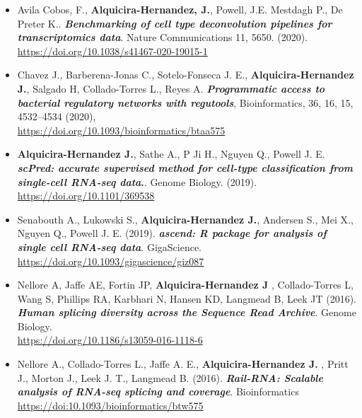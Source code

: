 \begin{itemize}
\item{Avila Cobos, F., \textbf{Alquicira-Hernandez, J.}, Powell, J.E. Mestdagh P., De Preter K.. \textit{\textbf{Benchmarking of cell type deconvolution pipelines for transcriptomics data}}.
Nature Communications 11, 5650. (2020). \\
\url{https://doi.org/10.1038/s41467-020-19015-1}}

\item{Chavez J., Barberena-Jonas C., Sotelo-Fonseca J. E., \textbf{Alquicira-Hernandez J.}, Salgado H, Collado-Torres L., Reyes A. \textbf{\textit{Programmatic access to bacterial regulatory networks with regutools}}, Bioinformatics, 36, 16, 15, 4532–4534 (2020), \\
\url{https://doi.org/10.1093/bioinformatics/btaa575}}

\item{\textbf{Alquicira-Hernandez J.}, Sathe A., P Ji H., Nguyen Q., Powell J. E. \textbf{\textit{scPred: accurate supervised method for cell-type classification from single-cell RNA-seq data}.}.
Genome Biology. (2019).\\
\url{https://doi.org/10.1101/369538}}

\item{Senabouth A., Lukowski S., \textbf{Alquicira-Hernandez J.}, Andersen S., Mei X., Nguyen Q., Powell J. E. (2019). \textbf{\textit{ascend: R package for analysis of single cell RNA-seq data}}.
GigaScience. \\
\url{https://doi.org/10.1093/gigascience/giz087}}

\item{Nellore A, Jaffe AE, Fortin JP, \textbf{Alquicira-Hernandez J} , Collado-Torres L, Wang S, Phillips RA, Karbhari N, Hansen KD, Langmead B, Leek JT (2016). \textbf{\textit{Human splicing diversity across the Sequence Read Archive}}.
Genome Biology.\\
\url{https://doi.org/10.1186/s13059-016-1118-6}}

\item{Nellore A., Collado-Torres L., Jaffe A. E., \textbf{Alquicira-Hernandez J.} , Pritt J., Morton J., Leek J. T., Langmead B. (2016). \textbf{\textit{Rail-RNA: Scalable analysis of RNA-seq splicing and coverage}}.
Bioinformatics  \\
\url{https://doi:10.1093/bioinformatics/btw575}}


\end{itemize}
